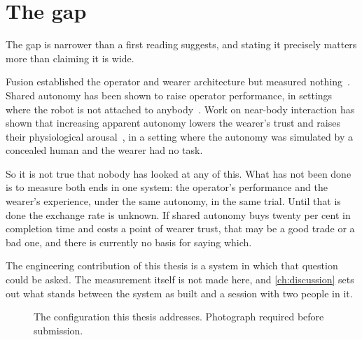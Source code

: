 \section{The gap}

The gap is narrower than a first reading suggests, and stating it precisely
matters more than claiming it is wide.

Fusion established the operator and wearer architecture but measured
nothing~\cite{saraiji2018fusion}. Shared autonomy has been shown to raise
operator performance, in settings where the robot is not attached to
anybody~\cite{dragan2013policyblending,javdani2015hindsight}. Work on
near-body interaction has shown that increasing apparent autonomy lowers the
wearer's trust and raises their physiological
arousal~\cite{zhou2026proxemics}, in a setting where the autonomy was
simulated by a concealed human and the wearer had no task.

So it is not true that nobody has looked at any of this. What has not been
done is to measure both ends in one system: the operator's performance and the
wearer's experience, under the same autonomy, in the same trial. Until that is
done the exchange rate is unknown. If shared autonomy buys twenty per cent in
completion time and costs a point of wearer trust, that may be a good trade or
a bad one, and there is currently no basis for saying which.

The engineering contribution of this thesis is a system in which that question
could be asked. The measurement itself is not made here, and
\cref{ch:discussion} sets out what stands between the system as built and a
session with two people in it.

\begin{figure}[htbp]
  \centering
  \caption[The two-person configuration]{The configuration this thesis
  addresses. Photograph required before submission.}
  \label{fig:twoperson-photo}
\end{figure}
